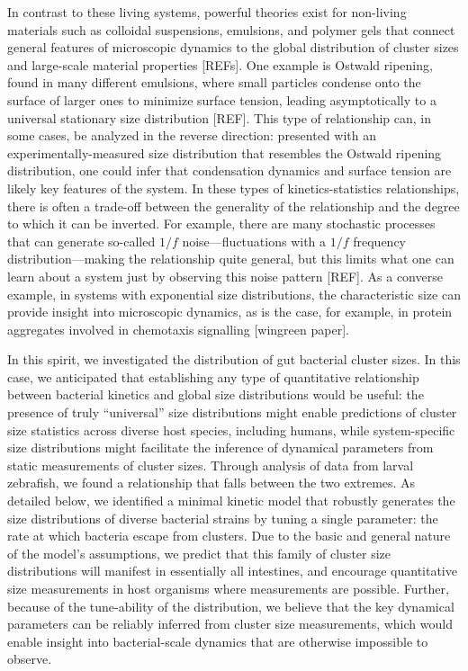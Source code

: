 \documentclass[aps,pre,twocolumn]{revtex4-1}
\begin{document}
In contrast to these living systems, powerful theories exist for non-living materials such as colloidal suspensions, emulsions, and polymer gels that connect general features of microscopic dynamics to the global distribution of cluster sizes and large-scale material properties [REFs]. One example is Ostwald ripening, found in many different emulsions, where small particles condense onto the surface of larger ones to minimize surface tension, leading asymptotically to a universal stationary size distribution [REF]. This type of relationship can, in some cases, be analyzed in the reverse direction: presented with an experimentally-measured size distribution that resembles the Ostwald ripening distribution, one could infer that condensation dynamics and surface tension are likely key features of the system.  In these types of kinetics-statistics relationships, there is often a trade-off between the generality of the relationship and the degree to which it can be inverted. For example, there are many stochastic processes that can generate so-called $1/f$ noise---fluctuations with a $1/f$ frequency distribution---making the relationship quite general, but this limits what one can learn about a system just by observing this noise pattern [REF]. As a converse example, in systems with exponential size distributions, the characteristic size can provide insight into microscopic dynamics, as is the case, for example, in protein aggregates involved in chemotaxis signalling [wingreen paper].  

In this spirit, we investigated the distribution of gut bacterial cluster sizes. In this case, we anticipated that establishing any type of quantitative relationship between bacterial kinetics and global size distributions would be useful: the presence of truly ``universal'' size distributions might enable predictions of cluster size statistics across diverse host species, including humans, while system-specific size distributions might facilitate the inference of dynamical parameters from static measurements of cluster sizes. Through analysis of data from larval zebrafish, we found a relationship that falls between the two extremes. As detailed below, we identified a minimal kinetic model that robustly generates the size distributions of diverse bacterial strains by tuning a single parameter: the rate at which bacteria escape from clusters. Due to the basic and general nature of the model's assumptions, we predict that this family of cluster size distributions will manifest in essentially all intestines, and encourage quantitative size measurements in host organisms where measurements are possible. Further, because of the tune-ability of the distribution, we believe that the key dynamical parameters can be reliably inferred from cluster size measurements, which would enable insight into bacterial-scale dynamics that are otherwise impossible to observe. 
\end{document}
